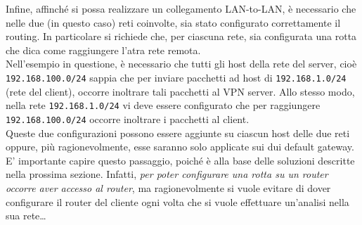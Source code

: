Infine, affinché si possa realizzare un collegamento LAN-to-LAN, è necessario che
nelle due (in questo caso) reti coinvolte, sia stato configurato correttamente
il routing. In particolare si richiede che, per ciascuna rete, sia configurata una rotta
che dica come raggiungere l'atra rete remota.\\
Nell'esempio in questione, è necessario che tutti gli host della rete del server, cioè
\texttt{192.168.100.0/24} sappia che per inviare pacchetti ad host di \texttt{192.168.1.0/24}
(rete del client), occorre inoltrare tali pacchetti al VPN server. Allo stesso modo,
nella rete \texttt{192.168.1.0/24} vi deve essere configurato che per raggiungere
\texttt{192.168.100.0/24} occorre inoltrare i pacchetti al client.\\
Queste due configurazioni possono essere aggiunte su ciascun host delle due reti oppure,
più ragionevolmente, esse saranno solo applicate sui dui default gateway. E' importante
capire questo passaggio, poiché è alla base delle soluzioni descritte nella prossima
sezione. Infatti, \textit{per poter configurare una rotta su un router occorre aver
accesso al router}, ma ragionevolmente si vuole evitare di dover configurare
il router del cliente ogni volta che si vuole effettuare un'analisi nella sua rete\ldots




